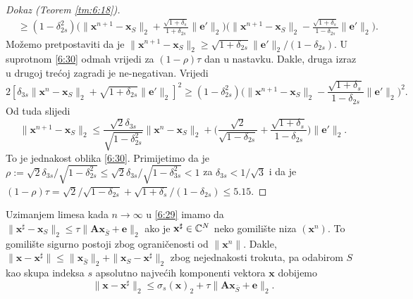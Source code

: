 \documentclass[a4paper,twoside,12pt]{memoir} %
\newcommand{\vect}[1]{\mathbf{#1}}
\renewcommand{\vec}{\vect}
\newcommand{\norm}[1]{\|{#1}\|}
\begin{document}
\begin{proof}[Dokaz (Teorem \ref{tm:6:18})]
\begin{align*}
        &\geq(1-\delta_{2s}^2)\big( \norm{\vec x^{n+1} - \vec x_S}_2 + \frac{\sqrt{1+\delta_s}}{1+\delta_{2s}} \norm{\vec e'}_2  \big)\big( \norm{\vec x^{n+1} - \vec x_S}_2 - \frac{\sqrt{1+\delta_s}}{1-\delta_{2s}} \norm{\vec e'}_2 \big).
    \end{align*}
    Mo\v{z}emo pretpostaviti da je $\norm{\vec x^{n+1} - \vec x_S}_2 \geq \sqrt{1+\delta_{2s}}\norm{\vec e'}_2 / (1- \delta_{2s})$. U suprotnom \eqref{6:30} odmah vrijedi za $(1-\rho)\tau$ dan u nastavku. Dakle, druga izraz u drugoj tre\'coj zagradi je ne-negativan. Vrijedi
    \begin{equation*}
        2[\delta_{3s} \norm{\vec x^n - \vec x_S}_2 + \sqrt{1+\delta_{2s}}\norm{\vec e'}_2]^2 \geq (1-\delta_{2s}^2) \big( \norm{\vec x^{n+1} - \vec x_S}_2 - \frac{\sqrt{1+\delta_s}}{1-\delta_{2s}} \norm{\vec e'}_2  \big)^2.
    \end{equation*}
    Od tuda slijedi
    \begin{equation*}
        \norm{\vec x^{n+1} - \vec x_S}_2 \leq \frac{\sqrt{2} \delta_{3s}}{\sqrt{1-\delta_{2s}^{2}}} \norm{\vec x^n - \vec x_S}_2 + \big( \frac{\sqrt{2}}{\sqrt{1-\delta_{2s}}} + \frac{\sqrt{1+\delta_s}}{1-\delta_{2s}}   \big) \norm{\vec e'}_2.
    \end{equation*}
    To je jednakost oblika \eqref{6:30}. Primijetimo da je $\rho := \sqrt{2}\delta_{3s}/\sqrt{1-\delta_{2s}^2} \leq \sqrt{2} \delta_{3s}/\sqrt{1-\delta_{3s}^2} < 1$ za $\delta_{3s} < 1/\sqrt{3}$ i da je $(1-\rho)\tau = \sqrt{2}/\sqrt{1-\delta_{2s}} + \sqrt{1+\delta_s}/(1-\delta_{2s}) \leq 5.15$.
\end{proof}
Uzimanjem limesa kada $n \rightarrow \infty$ u \eqref{6:29} imamo da $\norm{\vec x^{\sharp}  - \vec x_S}_2 \leq \tau \norm{\vec{Ax}_{\bar S} + \vec e}_2$ ako je $\vec x^{\sharp} \in \C^N$ neko gomili\v{s}te niza $(\vec x^n)$. To gomili\v{s}te sigurno postoji zbog ograni\v{c}enosti od $\norm{\vec x^n}$. Dakle, $\norm{\vec x - \vec x^{\sharp}} \leq \norm{\vec x_{\bar S}}_2 + \norm{\vec x_S - \vec x^{\sharp}}_2$ zbog nejednakosti trokuta, pa odabirom $S$ kao skupa indeksa $s$ apsolutno najve\'cih komponenti vektora $\vec x$ dobijemo
\begin{equation}\label{6:32}
    \norm{\vec x - \vec x^{\sharp}}_2 \leq \sigma_s(\vec x)_2 + \tau \norm{\vec{Ax}_{\bar S} + \vec e}_2.
\end{equation}
\end{document}
